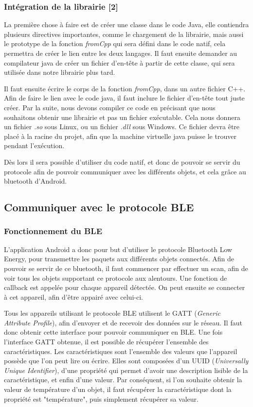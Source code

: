 \subsubsection{Intégration de la librairie [2]}
La première chose à faire est de créer une classe dans le code Java, elle contiendra plusieurs directives 
importantes, comme le chargement de la librairie, mais aussi le prototype de la fonction \emph{fromCpp} qui 
sera défini dans le code natif, cela permettra de créer le lien entre les deux langages. Il faut ensuite 
demander au compilateur java de créer un fichier d'en-tête à partir de cette classe, qui sera utilisée dans 
notre librairie plus tard.

Il faut ensuite écrire le corps de la fonction \emph{fromCpp}, dans un autre fichier C++. Afin de faire le 
lien avec le code java, il faut inclure le fichier d'en-tête tout juste créer. Par la suite, nous devons 
compiler ce code en précisant que nous souhaitons obtenir une librairie et pas un fichier exécutable. Cela 
nous donnera un fichier \emph{.so} sous Linux, ou un fichier \emph{.dll} sous Windows. Ce fichier devra 
être placé à la racine du projet, afin que la machine virtuelle java puisse le trouver pendant l'exécution.

Dès lors il sera possible d'utiliser du code natif, et donc de pouvoir se servir du protocole afin 
de pouvoir communiquer avec les différents objets, et cela grâce au bluetooth d'Android.


	\subsection{Communiquer avec le protocole BLE}
	  \subsubsection{Fonctionnement du BLE}
L'application Android a donc pour but d'utiliser le protocole Bluetooth Low Energy, pour transmettre les 
paquets aux différents objets connectés. Afin de pouvoir se servir de ce bluetooth, il faut commencer par 
effectuer un scan, afin de voir tous les objets supportant ce protocole aux alentours. Une fonction de 
callback est appelée pour chaque appareil détectée. On peut ensuite se connecter à cet appareil, afin d'être appairé avec celui-ci.

Tous les appareils utilisant le protocole BLE utilisent le GATT (\emph{Generic Attribute Profile}), afin 
d'envoyer et de recevoir des données sur le réseau. Il faut donc obtenir cette interface pour pouvoir 
communiquer en BLE. Une fois l'interface GATT obtenue, il est possible de récupérer l'ensemble des 
caractéristiques. Les caractéristiques sont l'ensemble des valeurs que l'appareil possède que l'on peut lire 
ou écrire. Elles sont composées d'un UUID (\emph{Universally Unique Identifier}), d'une propriété qui permet 
d'avoir une description lisible de la caractéristique, et enfin d'une valeur. Par conséquent, si l'on souhaite 
obtenir la valeur de température d'un objet, il faut récupérer la caractéristique dont la propriété est 
"température", puis simplement récupérer sa valeur.

